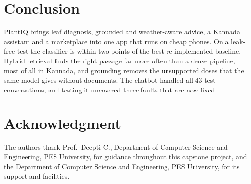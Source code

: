 \section{Conclusion}
PlantIQ brings leaf diagnosis, grounded and weather-aware advice, a Kannada assistant and a marketplace into one app
that runs on cheap phones. On a leak-free test the classifier is within two points of the best re-implemented
baseline. Hybrid retrieval finds the right passage far more often than a dense pipeline, most of all in Kannada, and
grounding removes the unsupported doses that the same model gives without documents. The chatbot handled all 43 test
conversations, and testing it uncovered three faults that are now fixed.

\section*{Acknowledgment}
The authors thank Prof.\ Deepti C., Department of Computer Science and Engineering, PES University, for guidance
throughout this capstone project, and the Department of Computer Science and Engineering, PES University, for its
support and facilities.

\providecommand{\plantiqbalancerefs}{}\plantiqbalancerefs
\ifdefined\plantiqusebibtex


\else

\fi


